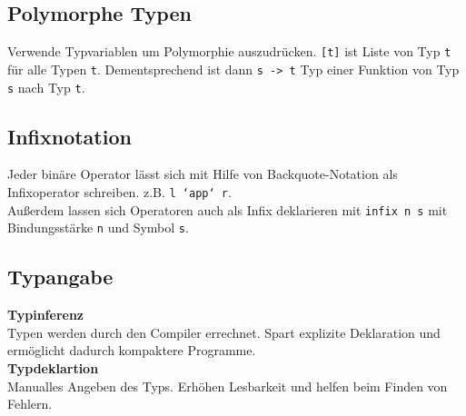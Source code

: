 \documentclass[10pt,a4paper]{article}
\def\code#1{\texttt{#1}}
\begin{document}
        \subsection{Polymorphe Typen}
        Verwende Typvariablen um Polymorphie auszudrücken.
        \code{[t]} ist Liste von Typ \code{t} für alle Typen \code{t}.
        Dementsprechend ist dann \code{s -> t} Typ einer Funktion von Typ \code{s} nach Typ \code{t}.

        \subsection{Infixnotation}
        Jeder binäre Operator lässt sich mit Hilfe von Backquote-Notation als Infixoperator schreiben.
        z.B. \code{l `app` r}.\\
        Außerdem lassen sich Operatoren auch als Infix deklarieren mit \code{infix n s} mit Bindungsstärke \code{n} und Symbol \code{s}.

        \subsection{Typangabe}
        \textbf{Typinferenz}\\
        Typen werden durch den Compiler errechnet. Spart explizite Deklaration und ermöglicht dadurch kompaktere Programme.\\
        \textbf{Typdeklartion}\\
        Manualles Angeben des Typs. Erhöhen Lesbarkeit und helfen beim Finden von Fehlern.
        
        
\end{document}
